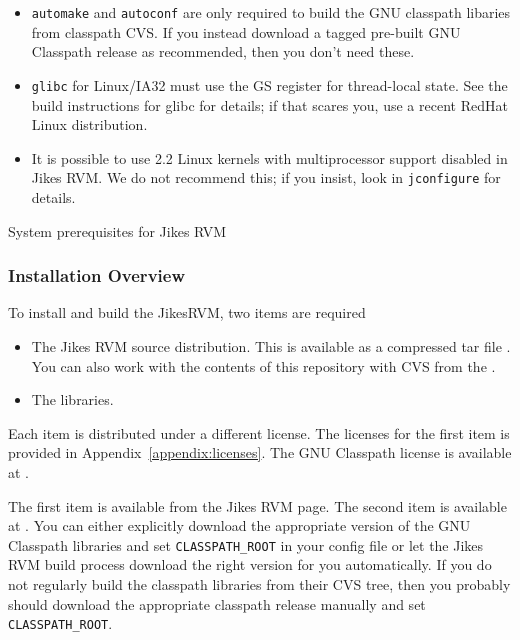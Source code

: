 \begin{table}[h]
\begin{center}
\begin{itemize}
\item {\tt automake} and {\tt autoconf} are only required to build the
GNU classpath libaries from classpath CVS. If you instead download a
tagged pre-built GNU Classpath release as recommended, then you don't need
these.
\item {\tt glibc} for Linux/IA32 must use the GS register for
thread-local state.  See the build instructions for glibc for details;
if that scares you, use a recent RedHat Linux distribution.
\item It is possible to use 2.2 Linux kernels with multiprocessor
support disabled in Jikes RVM.  We do not recommend this; if you
insist, look in {\tt jconfigure} for details.
\end{itemize}
\end{center}
\caption{System prerequisites for Jikes RVM}
\label{prereqs}
\end{table}

\AIXPPCJikesTMFooter

\JavaTMFooter

\subsubsection{Installation Overview}

To install and build the Jikes\trademark RVM, two items are required
\begin{itemize}
\item The Jikes RVM source distribution.  This is available as a
compressed tar file {\tt \RVMTarFile}.  You can also work with the
contents of this repository with CVS from the 
.

\item The 
 libraries. 
\end{itemize}

Each item is distributed under a different license.  The licenses for
the first item is provided in Appendix~\ref{appendix:licenses}.  The
GNU Classpath license is available at \xlink{{\tt
\classpathURL}}{\classpathURL}. 

The first item is available  from the Jikes RVM
 page. The second item is available at
\xlink{{\tt \classpathURL}}{\classpathURL}.
You can either explicitly download the appropriate version of the GNU
Classpath libraries and set {\tt CLASSPATH\_ROOT} in your config file or let
the Jikes RVM build process download the right version for you
automatically. If you do not regularly build the classpath libraries
from their CVS tree, then you probably should download the appropriate
classpath release manually and set {\tt CLASSPATH\_ROOT}. 

